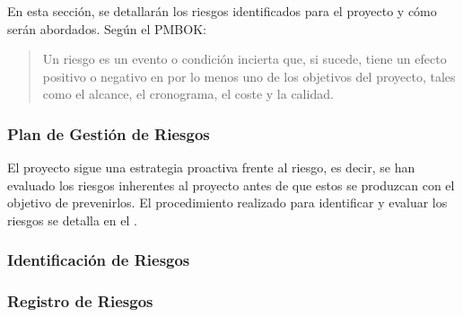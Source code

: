 En esta sección, se detallarán los riesgos identificados para el proyecto y cómo serán abordados. Según el PMBOK:
\begin{quote}
Un riesgo es un evento o condición incierta que, si sucede, tiene un efecto positivo o negativo en por lo menos uno de los objetivos del proyecto, tales como el alcance, el cronograma, el coste y la calidad. \cite{pmbok2013}
\end{quote}

\subsubsection{Plan de Gestión de Riesgos} 
El proyecto sigue una estrategia proactiva frente al riesgo, es decir, se han evaluado los riesgos inherentes al proyecto antes de que estos se produzcan con el objetivo de prevenirlos. El procedimiento realizado para identificar y evaluar los riesgos se detalla en el .

\subsubsection{Identificación de Riesgos}


\subsubsection{Registro de Riesgos}

